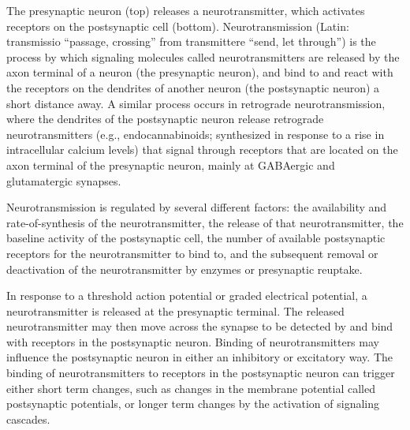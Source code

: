 The presynaptic neuron (top) releases a neurotransmitter, which activates receptors on the postsynaptic cell (bottom).
Neurotransmission (Latin: transmissio ``passage, crossing'' from transmittere ``send, let through'') is the process by which signaling molecules called neurotransmitters are released by the axon terminal of a neuron (the presynaptic neuron), and bind to and react with the receptors on the dendrites of another neuron (the postsynaptic neuron) a short distance away. A similar process occurs in retrograde neurotransmission, where the dendrites of the postsynaptic neuron release retrograde neurotransmitters (e.g., endocannabinoids; synthesized in response to a rise in intracellular calcium levels) that signal through receptors that are located on the axon terminal of the presynaptic neuron, mainly at GABAergic and glutamatergic synapses.

Neurotransmission is regulated by several different factors: the availability and rate-of-synthesis of the neurotransmitter, the release of that neurotransmitter, the baseline activity of the postsynaptic cell, the number of available postsynaptic receptors for the neurotransmitter to bind to, and the subsequent removal or deactivation of the neurotransmitter by enzymes or presynaptic reuptake.

In response to a threshold action potential or graded electrical potential, a neurotransmitter is released at the presynaptic terminal. The released neurotransmitter may then move across the synapse to be detected by and bind with receptors in the postsynaptic neuron. Binding of neurotransmitters may influence the postsynaptic neuron in either an inhibitory or excitatory way. The binding of neurotransmitters to receptors in the postsynaptic neuron can trigger either short term changes, such as changes in the membrane potential called postsynaptic potentials, or longer term changes by the activation of signaling cascades.

